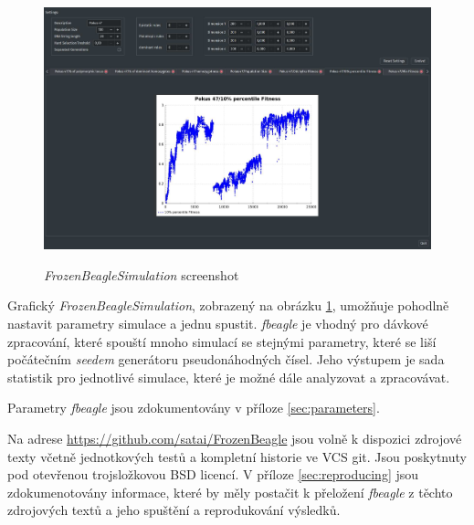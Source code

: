 \begin{figure}[h]
\caption{\textit{FrozenBeagleSimulation} screenshot}
\centering
\includegraphics[width=\textwidth]{img/Screenshot.pdf}
\label{fig:FrozenBeagleScreenshot}
\end{figure}

Grafický \textit{FrozenBeagleSimulation}, zobrazený na obrázku \ref{fig:FrozenBeagleScreenshot},
umožňuje pohodlně nastavit parametry simulace a jednu spustit. \textit{fbeagle} je vhodný pro dávkové zpracování,
které spouští mnoho simulací se stejnými parametry, které se liší počátečním \textit{seedem} generátoru
pseudonáhodných čísel. Jeho výstupem je sada statistik pro jednotlivé simulace, které je možné dále analyzovat
a zpracovávat.

Parametry \textit{fbeagle} jsou zdokumentovány v příloze \ref{sec:parameters}.

Na adrese \url {https://github.com/satai/FrozenBeagle} jsou volně k dispozici zdrojové texty včetně jednotkových testů
a kompletní historie ve VCS git. Jsou poskytnuty pod otevřenou trojsložkovou BSD licencí. V příloze \ref{sec:reproducing} jsou
zdokumenotovány informace, které by měly postačit k přeložení \textit{fbeagle} z těchto zdrojových textů
a jeho spuštění a reprodukování výsledků.

\vspace{1em}

